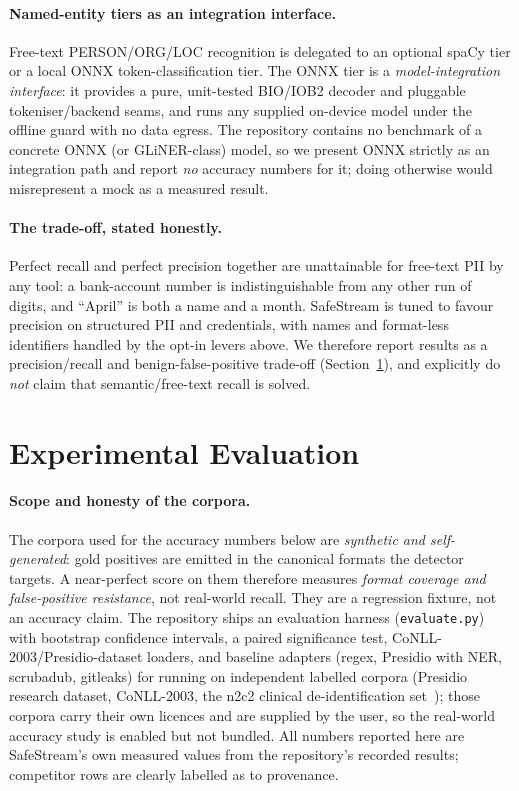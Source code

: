 \documentclass[runningheads]{llncs}
\begin{document}
\paragraph{Named-entity tiers as an integration interface.}
Free-text PERSON/ORG/LOC recognition is delegated to an optional spaCy tier or a
local ONNX token-classification tier. The ONNX tier is a \emph{model-integration
interface}: it provides a pure, unit-tested BIO/IOB2 decoder and pluggable
tokeniser/backend seams, and runs any supplied on-device model under the offline
guard with no data egress. The repository contains no benchmark of a concrete
ONNX (or GLiNER-class) model, so we present ONNX strictly as an integration path
and report \emph{no} accuracy numbers for it; doing otherwise would misrepresent
a mock as a measured result.

\paragraph{The trade-off, stated honestly.}
Perfect recall and perfect precision together are unattainable for free-text PII
by any tool: a bank-account number is indistinguishable from any other run of
digits, and ``April'' is both a name and a month. SafeStream is tuned to favour
precision on structured PII and credentials, with names and format-less
identifiers handled by the opt-in levers above. We therefore report results as a
precision/recall and benign-false-positive trade-off (Section~\ref{sec:eval}),
and explicitly do \emph{not} claim that semantic/free-text recall is solved.

\section{Experimental Evaluation}
\label{sec:eval}

\paragraph{Scope and honesty of the corpora.}
The corpora used for the accuracy numbers below are \emph{synthetic and
self-generated}: gold positives are emitted in the canonical formats the
detector targets. A near-perfect score on them therefore measures \emph{format
coverage and false-positive resistance}, not real-world recall. They are a
regression fixture, not an accuracy claim. The repository ships an evaluation
harness (\texttt{evaluate.py}) with bootstrap confidence intervals, a paired
significance test, CoNLL-2003/Presidio-dataset loaders, and baseline adapters
(regex, Presidio with NER, scrubadub, gitleaks) for running on independent
labelled corpora (Presidio research dataset, CoNLL-2003, the n2c2 clinical
de-identification set~\cite{conll2003,n2c2}); those corpora carry their own
licences and are supplied by the user, so the real-world accuracy study is
enabled but not bundled. All numbers reported here are SafeStream's own measured
values from the repository's recorded results; competitor rows are clearly
labelled as to provenance.
\end{document}

